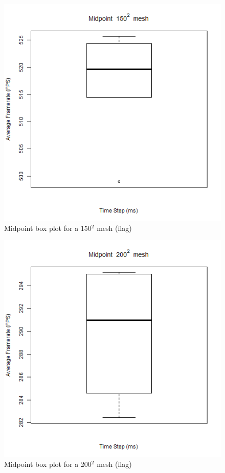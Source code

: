       \begin{figure}
    \begin{center}
      \includegraphics[scale=.9]{Figures/flag_m_150_box}
    \end{center}
    \caption{Midpoint box plot for a 150$^{2}$ mesh (flag)}
    \label{fig:m box 150 flag}
  \end{figure}
  
      \begin{figure}
    \begin{center}
      \includegraphics[scale=.9]{Figures/flag_m_200_box}
    \end{center}
    \caption{Midpoint box plot for a 200$^{2}$ mesh (flag)}
    \label{fig:m box 200 flag}
  \end{figure}
  
